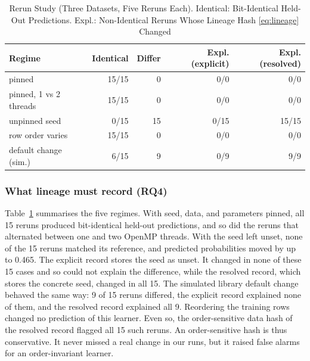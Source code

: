\documentclass[journal]{IEEEtran}
\begin{document}
\begin{table}[!t]
\caption{Rerun Study (Three Datasets, Five Reruns Each). Identical: Bit-Identical Held-Out Predictions. Expl.: Non-Identical Reruns Whose Lineage Hash \eqref{eq:lineage} Changed}
\label{tab:repro}
\centering
\footnotesize
\setlength{\tabcolsep}{3pt}
\begin{tabular}{@{}lrrrr@{}}
\toprule
Regime & Identical & Differ & Expl. (explicit) & Expl. (resolved) \\
\midrule
pinned & 15/15 & 0 & 0/0 & 0/0 \\
pinned, 1 vs 2 threads & 15/15 & 0 & 0/0 & 0/0 \\
unpinned seed & 0/15 & 15 & 0/15 & 15/15 \\
row order varies & 15/15 & 0 & 0/0 & 0/0 \\
default change (sim.) & 6/15 & 9 & 0/9 & 9/9 \\
\bottomrule
\end{tabular}
\end{table}

\subsubsection{What lineage must record (RQ4)}
Table~\ref{tab:repro} summarises the five regimes. With seed, data, and parameters pinned, all 15 reruns produced bit-identical held-out predictions, and so did the reruns that alternated between one and two OpenMP threads. With the seed left unset, none of the 15 reruns matched its reference, and predicted probabilities moved by up to 0.465. The explicit record stores the seed as unset. It changed in none of these 15 cases and so could not explain the difference, while the resolved record, which stores the concrete seed, changed in all 15. The simulated library default change behaved the same way: 9 of 15 reruns differed, the explicit record explained none of them, and the resolved record explained all 9. Reordering the training rows changed no prediction of this learner. Even so, the order-sensitive data hash of the resolved record flagged all 15 such reruns. An order-sensitive hash is thus conservative. It never missed a real change in our runs, but it raised false alarms for an order-invariant learner.
\end{document}

